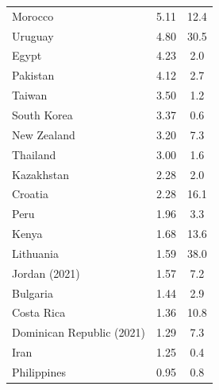 \begin{longtable}{lcc}
	Morocco                   & 5.11                          & 12.4                              \\
	Uruguay                   & 4.80                          & 30.5                              \\
	Egypt                     & 4.23                          & 2.0                               \\
	Pakistan                  & 4.12                          & 2.7                               \\
	Taiwan                    & 3.50                          & 1.2                               \\
	South Korea               & 3.37                          & 0.6                               \\
	New Zealand               & 3.20                          & 7.3                               \\
	Thailand                  & 3.00                          & 1.6                               \\
	Kazakhstan                & 2.28                          & 2.0                               \\
	Croatia                   & 2.28                          & 16.1                              \\
	Peru                      & 1.96                          & 3.3                               \\
	Kenya                     & 1.68                          & 13.6                              \\
	Lithuania                 & 1.59                          & 38.0                              \\
	Jordan (2021)             & 1.57                          & 7.2                               \\
	Bulgaria                  & 1.44                          & 2.9                               \\
	Costa Rica                & 1.36                          & 10.8                              \\
	Dominican Republic (2021) & 1.29                          & 7.3                               \\
	Iran                      & 1.25                          & 0.4                               \\
	Philippines               & 0.95                          & 0.8                               \\

\end{longtable}
